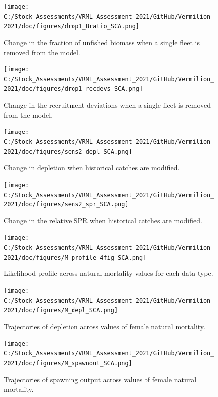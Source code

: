 \documentclass[
  english,
  a4paper,
]{article}
\begin{document}
\begin{figure}
\centering
\texttt{[image: C:/Stock\_Assessments/VRML\_Assessment\_2021/GitHub/Vermilion\_2021/doc/figures/drop1\_Bratio\_SCA.png]}
\caption{Change in the fraction of unfished biomass when a single fleet is removed from the model.\label{fig:drop-bratio}}
\end{figure}

\begin{figure}
\centering
\texttt{[image: C:/Stock\_Assessments/VRML\_Assessment\_2021/GitHub/Vermilion\_2021/doc/figures/drop1\_recdevs\_SCA.png]}
\caption{Change in the recruitment deviations when a single fleet is removed from the model.\label{fig:drop-recdev}}
\end{figure}

\begin{figure}
\centering
\texttt{[image: C:/Stock\_Assessments/VRML\_Assessment\_2021/GitHub/Vermilion\_2021/doc/figures/sens2\_depl\_SCA.png]}
\caption{Change in depletion when historical catches are modified.\label{fig:sens2-depl}}
\end{figure}

\begin{figure}
\centering
\texttt{[image: C:/Stock\_Assessments/VRML\_Assessment\_2021/GitHub/Vermilion\_2021/doc/figures/sens2\_spr\_SCA.png]}
\caption{Change in the relative SPR when historical catches are modified.\label{fig:sens2-spr}}
\end{figure}

\begin{figure}
\centering
\texttt{[image: C:/Stock\_Assessments/VRML\_Assessment\_2021/GitHub/Vermilion\_2021/doc/figures/M\_profile\_4fig\_SCA.png]}
\caption{Likelihood profile across natural mortality values for each data type.\label{fig:m-profile}}
\end{figure}

\begin{figure}
\centering
\texttt{[image: C:/Stock\_Assessments/VRML\_Assessment\_2021/GitHub/Vermilion\_2021/doc/figures/M\_depl\_SCA.png]}
\caption{Trajectories of depletion across values of female natural mortality.\label{fig:m-depl}}
\end{figure}

\begin{figure}
\centering
\texttt{[image: C:/Stock\_Assessments/VRML\_Assessment\_2021/GitHub/Vermilion\_2021/doc/figures/M\_spawnout\_SCA.png]}
\caption{Trajectories of spawning output across values of female natural mortality.\label{fig:m-spawn}}
\end{figure}
\end{document}
